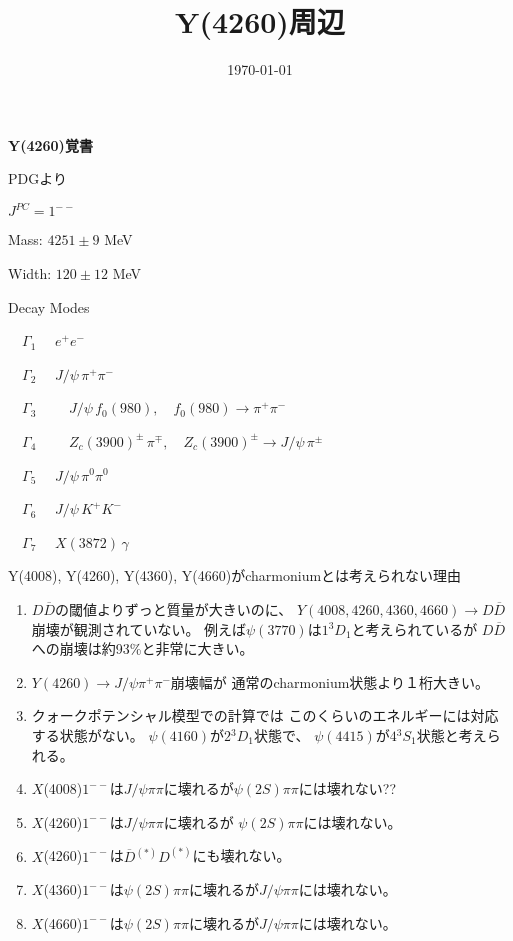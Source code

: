 \documentclass[a4j]{jarticle}
\def\Jpsi{{J\!/\!\psi}{}}
\def\Dbar{\overline{{D}}{}}
\begin{document}
\title{Y(4260)周辺}
\author{}
\date{\today}
\maketitle


{\bf \Large Y(4260)覚書}
%
%
\par
\vspace*{5mm}
PDGより

$J^{PC} = 1^{--}$

Mass:  $4251 \pm 9$ MeV

Width:  $120\pm 12$ MeV

Decay Modes

　$\Gamma_1 \quad$ $e^+ e^-$

　$\Gamma_2 \quad$ $J/\psi \, \pi^+ \pi^-$

　$\Gamma_3 \quad \quad$ $J/\psi \, f_0(980), \quad  f_0(980) \to \pi^+ \pi^-$

　$\Gamma_4 \quad \quad$ $Z_c(3900)^\pm \, \pi^\mp, \quad  Z_c(3900)^\pm \to J/\psi \, \pi^\pm$

　$\Gamma_5 \quad$ $J/\psi \, \pi^0 \pi^0$

　$\Gamma_6 \quad$ $J/\psi \, K^+ K^-$

　$\Gamma_7 \quad$ $X(3872) \, \gamma$
%
%
%
\par
\vspace*{5mm}
Y(4008), Y(4260), Y(4360), Y(4660)がcharmoniumとは考えられない理由
 \begin{enumerate}
\item
$D \overline{D}$の閾値よりずっと質量が大きいのに、
$Y(4008,4260,4360,4660) \to D \overline{D}$崩壊が観測されていない。
例えば$\psi(3770)$は$1 {}^3D_1$と考えられているが
$D \overline{D}$への崩壊は約93\%と非常に大きい。

\item
$Y(4260) \to J/\psi \pi^+ \pi^-$崩壊幅が
通常のcharmonium状態より１桁大きい。

\item
クォークポテンシャル模型での計算では
このくらいのエネルギーには対応する状態がない。
$\psi(4160)$が$2 {}^3 D_1$状態で、
$\psi(4415)$が$4 {}^3 S_1$状態と考えられる。


\item 
$X$(4008)$1^{--}$は$\Jpsi\pi\pi$に壊れるが$\psi(2S)\pi\pi$には壊れない??
\item 
$X$(4260)$1^{--}$は$\Jpsi\pi\pi$に壊れるが $\psi(2S)\pi\pi$には壊れない。
\item 
$X$(4260)$1^{--}$は$\Dbar^(*) D^(*)$にも壊れない。
\item 
$X$(4360)$1^{--}$は$\psi(2S)\pi\pi$に壊れるが$\Jpsi\pi\pi$には壊れない。
\item 
$X$(4660)$1^{--}$は$\psi(2S)\pi\pi$に壊れるが$\Jpsi\pi\pi$には壊れない。
\end{enumerate}
\end{document}
